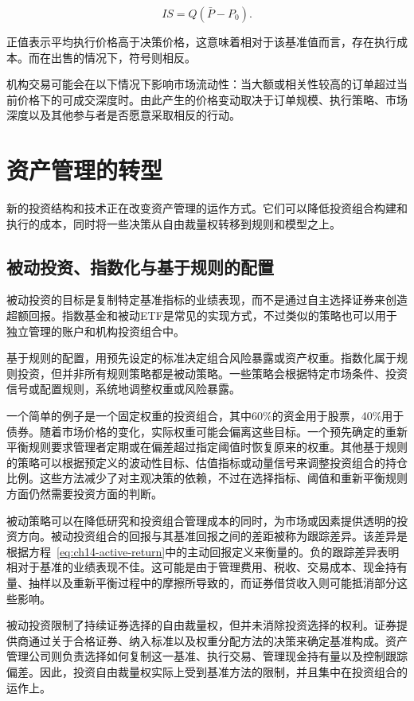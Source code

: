\begin{equation}
IS=Q(\bar{P}-P_0).
\label{eq:ch14-implementation-shortfall}
\end{equation}

正值表示平均执行价格高于决策价格，这意味着相对于该基准值而言，存在执行成本。而在出售的情况下，符号则相反。

机构交易可能会在以下情况下影响市场流动性：当大额或相关性较高的订单超过当前价格下的可成交深度时。由此产生的价格变动取决于订单规模、执行策略、市场深度以及其他参与者是否愿意采取相反的行动。

\section{资产管理的转型}

新的投资结构和技术正在改变资产管理的运作方式。它们可以降低投资组合构建和执行的成本，同时将一些决策从自由裁量权转移到规则和模型之上。

\subsection{被动投资、指数化与基于规则的配置}

被动投资的目标是复制特定基准指标的业绩表现，而不是通过自主选择证券来创造超额回报。指数基金和被动ETF是常见的实现方式，不过类似的策略也可以用于独立管理的账户和机构投资组合中。

基于规则的配置，用预先设定的标准决定组合风险暴露或资产权重。指数化属于规则投资，但并非所有规则策略都是被动策略。一些策略会根据特定市场条件、投资信号或配置规则，系统地调整权重或风险暴露。

一个简单的例子是一个固定权重的投资组合，其中60\%的资金用于股票，40\%用于债券。随着市场价格的变化，实际权重可能会偏离这些目标。一个预先确定的重新平衡规则要求管理者定期或在偏差超过指定阈值时恢复原来的权重。其他基于规则的策略可以根据预定义的波动性目标、估值指标或动量信号来调整投资组合的持仓比例。这些方法减少了对主观决策的依赖，不过在选择指标、阈值和重新平衡规则方面仍然需要投资方面的判断。

被动策略可以在降低研究和投资组合管理成本的同时，为市场或因素提供透明的投资方向。被动投资组合的回报与其基准回报之间的差距被称为跟踪差异。该差异是根据方程~\eqref{eq:ch14-active-return}中的主动回报定义来衡量的。负的跟踪差异表明相对于基准的业绩表现不佳。这可能是由于管理费用、税收、交易成本、现金持有量、抽样以及重新平衡过程中的摩擦所导致的，而证券借贷收入则可能抵消部分这些影响。

被动投资限制了持续证券选择的自由裁量权，但并未消除投资选择的权利。证券提供商通过关于合格证券、纳入标准以及权重分配方法的决策来确定基准构成。资产管理公司则负责选择如何复制这一基准、执行交易、管理现金持有量以及控制跟踪偏差。因此，投资自由裁量权实际上受到基准方法的限制，并且集中在投资组合的运作上。

